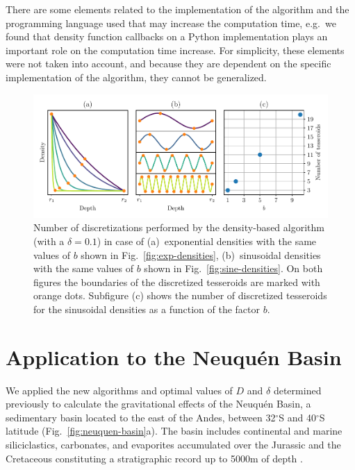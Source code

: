\documentclass[extra, referee]{gji}
\begin{document}
There are some elements related to the implementation of the algorithm and the
programming language used that may increase the computation time, e.g.~we found that
density function callbacks on a Python implementation plays an important role on the
computation time increase.
For simplicity, these elements were not taken into account, and because they are
dependent on the specific implementation of the algorithm, they cannot be generalized.

\begin{figure}
\centering
\includegraphics[width=\linewidth]{figures/number-of-tesseroids.pdf}
\caption{
    Number of discretizations performed by the density-based algorithm
    (with a $\delta = 0.1$) in case of
    (a)~exponential densities with the same values of $b$ shown in
    Fig.~\ref{fig:exp-densities},
    (b)~sinusoidal densities with the same values of $b$ shown in
    Fig.~\ref{fig:sine-densities}.
    On both figures the boundaries of the discretized tesseroids are marked with orange
    dots.
    Subfigure (c) shows the number of discretized tesseroids for the sinusoidal
    densities as a function of the factor $b$.
}
\label{fig:number-of-tesseroids}
\end{figure}



\section{Application to the Neuqu\'en Basin}

We applied the new algorithms and optimal values of $D$ and $\delta$ determined
previously to calculate the gravitational effects of the Neuqu\'en Basin,
a sedimentary basin located to the east of the Andes, between 32$^\circ$S and
40$^\circ$S latitude (Fig.~\ref{fig:neuquen-basin}a).
The basin includes continental and marine siliciclastics, carbonates, and evaporites
accumulated over the Jurassic and the Cretaceous constituting a stratigraphic record up
to 5000m of depth \citep{Howell2005}.
\end{document}
